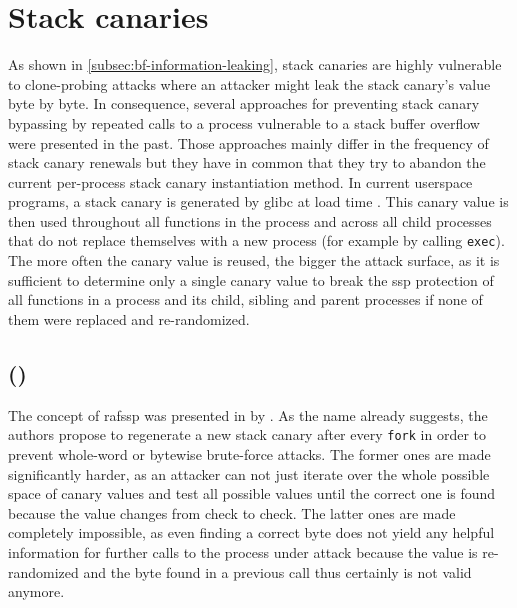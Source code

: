 \section{Stack canaries}
\label{sec:stack-canary-improvements}

As shown in \cref{subsec:bf-information-leaking}, stack canaries are highly vulnerable to clone-probing attacks where an attacker might leak the stack canary's value byte by byte.
In consequence, several approaches for preventing stack canary bypassing by repeated calls to a process vulnerable to a stack buffer overflow were presented in the past.
Those approaches mainly differ in the frequency of stack canary renewals but they have in common that they try to abandon the current per-process stack canary instantiation method.
In current userspace programs, a stack canary is generated by \gls{glibc} at load time \cite[\texttt{csu/libc-start.c}]{FSF2020a}.
This canary value is then used throughout all functions in the process and across all child processes that do not replace themselves with a new process (for example by calling \texttt{exec}).
The more often the canary value is reused, the bigger the attack surface, as it is sufficient to determine only a single canary value to break the \gls{ssp} protection of all functions in a process and its child, sibling and parent processes if none of them were replaced and re-randomized.

\subsection{ ()}
\label{subsec:renewssp}

The concept of \gls{rafssp} was presented in \citeyear{MarcoGisbert2013} by \citeauthor{MarcoGisbert2013}.
As the name already suggests, the authors propose to regenerate a new stack canary after every \texttt{fork} in order to prevent whole-word or bytewise brute-force attacks.
The former ones are made significantly harder, as an attacker can not just iterate over the whole possible space of canary values and test all possible values until the correct one is found because the value changes from check to check.
The latter ones are made completely impossible, as even finding a correct byte does not yield any helpful information for further calls to the process under attack because the value is re-randomized and the byte found in a previous call thus certainly is not valid anymore.

